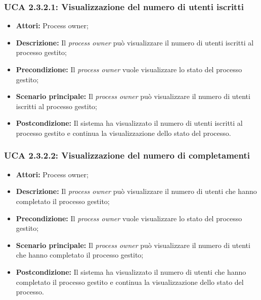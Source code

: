 \hypertarget{A2.3.2.1}{}
\subsubsection{UCA 2.3.2.1: Visualizzazione del numero di utenti iscritti}
\begin{itemize}
\item \textbf{Attori:} Process owner;
\item \textbf{Descrizione:}
Il \textit{process owner} può visualizzare il numero di utenti iscritti al processo gestito;
\item \textbf{Precondizione:}
Il \textit{process owner} vuole visualizzare lo stato del processo gestito;
\item \textbf{Scenario principale:}
Il \textit{process owner} può visualizzare il numero di utenti iscritti al processo gestito;
\item \textbf{Postcondizione:}
Il sistema ha visualizzato il numero di utenti iscritti al processo gestito e continua la visualizzazione dello stato del processo.
\end{itemize}

\hypertarget{A2.3.2.2}{}
\subsubsection{UCA 2.3.2.2: Visualizzazione del numero di completamenti}
\begin{itemize}
\item \textbf{Attori:} Process owner;
\item \textbf{Descrizione:}
Il \textit{process owner} può visualizzare il numero di utenti che hanno completato il processo gestito;
\item \textbf{Precondizione:}
Il \textit{process owner} vuole visualizzare lo stato del processo gestito;
\item \textbf{Scenario principale:}
Il \textit{process owner} può visualizzare il numero di utenti che hanno completato il processo gestito;
\item \textbf{Postcondizione:}
Il sistema ha visualizzato il numero di utenti che hanno completato il processo gestito e continua la visualizzazione dello stato del processo.
\end{itemize}

\hypertarget{A2.3.3}{}
